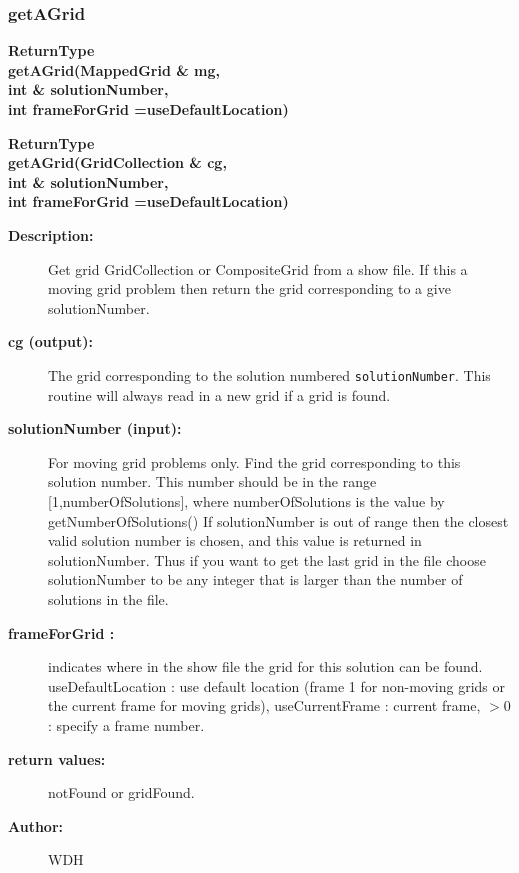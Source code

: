 \subsubsection{getAGrid}
 
\begin{flushleft} \textbf{%
ReturnType  \\ 
\settowidth{\ShowFileReaderIncludeArgIndent}{getAGrid(}%
getAGrid(MappedGrid \& mg, \\ 
\hspace{\ShowFileReaderIncludeArgIndent}int \& solutionNumber, \\ 
\hspace{\ShowFileReaderIncludeArgIndent}int frameForGrid  =useDefaultLocation)
}\end{flushleft}

 
\begin{flushleft} \textbf{%
ReturnType  \\ 
\settowidth{\ShowFileReaderIncludeArgIndent}{getAGrid(}%
getAGrid(GridCollection \& cg, \\ 
\hspace{\ShowFileReaderIncludeArgIndent}int \& solutionNumber, \\ 
\hspace{\ShowFileReaderIncludeArgIndent}int frameForGrid  =useDefaultLocation)
}\end{flushleft}
\begin{description}
\item[{\bf Description:}] 
   Get grid GridCollection or CompositeGrid from a show file. If this a moving grid problem then return the grid
    corresponding to a give solutionNumber.
\item[{\bf cg (output):}]  The grid corresponding to the solution numbered {\tt solutionNumber}. This
   routine will always read in a new grid if a grid is found.
\item[{\bf solutionNumber (input):}]  For moving grid problems only.
   Find the grid corresponding to this solution number. 
   This number should be
   in the range [1,numberOfSolutions], where numberOfSolutions is the value by getNumberOfSolutions()
   If solutionNumber is out of range then the closest valid solution number is chosen, and this value
   is returned in solutionNumber.  Thus if you want to get the last grid in the file choose
   solutionNumber to be any integer that is larger than the number of solutions in the file.
\item[{\bf frameForGrid :}]  indicates where in the show file the grid for this solution can be found.
     useDefaultLocation : use default location (frame 1 for non-moving grids or the current frame
    for moving grids), useCurrentFrame : current frame, $>0$ : specify a frame number. 
\item[{\bf return values:}]  notFound or gridFound.
\item[{\bf Author:}]  WDH
\end{description}
